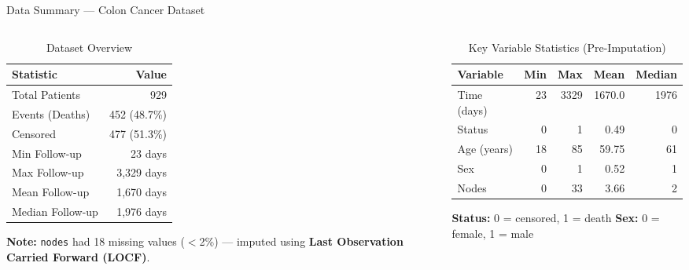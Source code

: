\documentclass[aspectratio=169, 11pt]{beamer}
\begin{document}
\begin{frame}{Data Summary --- Colon Cancer Dataset}
\begin{columns}[T]

  \begin{column}{0.44\textwidth}
    \vspace{4pt}
    \begin{table}
      \caption{Dataset Overview}
      \small
      \begin{tabular}{@{}lr@{}}
        \toprule
        \textbf{Statistic}     & \textbf{Value} \\
        \midrule
        Total Patients         & 929            \\
        Events (Deaths)        & 452 (48.7\%)   \\
        Censored               & 477 (51.3\%)   \\
        Min Follow-up          & 23 days        \\
        Max Follow-up          & 3{,}329 days   \\
        Mean Follow-up         & 1{,}670 days   \\
        Median Follow-up       & 1{,}976 days   \\
        \bottomrule
      \end{tabular}
    \end{table}
    \vspace{4pt}
    \footnotesize
    \textbf{Note:} \texttt{nodes} had 18 missing values ($<$2\%) ---
    imputed using \textbf{Last Observation Carried Forward (LOCF)}.
  \end{column}

  \begin{column}{0.52\textwidth}
    \vspace{4pt}
    \begin{table}
      \caption{Key Variable Statistics (Pre-Imputation)}
      \small
      \begin{tabular}{@{}lrrrr@{}}
        \toprule
        \textbf{Variable} & \textbf{Min} & \textbf{Max}
          & \textbf{Mean} & \textbf{Median}\\
        \midrule
        Time (days)  & 23   & 3329 & 1670.0 & 1976 \\
        Status       & 0    & 1    & 0.49   & 0    \\
        Age (years)  & 18   & 85   & 59.75  & 61   \\
        Sex          & 0    & 1    & 0.52   & 1    \\
        Nodes        & 0    & 33   & 3.66   & 2    \\
        \bottomrule
      \end{tabular}
    \end{table}
    \vspace{6pt}
    \footnotesize
    \textbf{Status:} 0 = censored, 1 = death \quad
    \textbf{Sex:} 0 = female, 1 = male
  \end{column}

\end{columns}
\end{frame}
\end{document}
